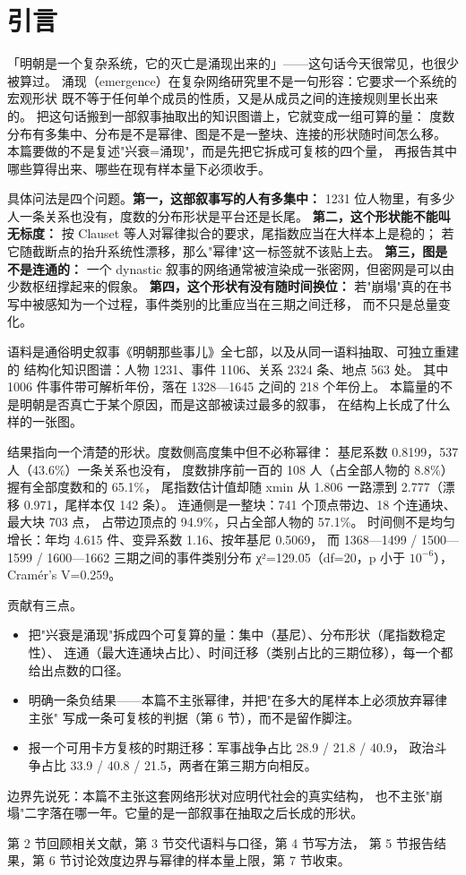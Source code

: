 \section{引言}

「明朝是一个复杂系统，它的灭亡是涌现出来的」——这句话今天很常见，也很少被算过。
涌现（emergence）在复杂网络研究里不是一句形容：它要求一个系统的宏观形状
既不等于任何单个成员的性质，又是从成员之间的连接规则里长出来的。
把这句话搬到一部叙事抽取出的知识图谱上，它就变成一组可算的量：
度数分布有多集中、分布是不是幂律、图是不是一整块、连接的形状随时间怎么移。
本篇要做的不是复述"兴衰=涌现"，而是先把它拆成可复核的四个量，
再报告其中哪些算得出来、哪些在现有样本量下必须收手。

具体问法是四个问题。\textbf{第一，这部叙事写的人有多集中：}
1231 位人物里，有多少人一条关系也没有，度数的分布形状是平台还是长尾。
\textbf{第二，这个形状能不能叫无标度：}
按 Clauset 等人对幂律拟合的要求，尾指数应当在大样本上是稳的；
若它随截断点的抬升系统性漂移，那么"幂律"这一标签就不该贴上去。
\textbf{第三，图是不是连通的：}
一个 dynastic 叙事的网络通常被渲染成一张密网，但密网是可以由少数枢纽撑起来的假象。
\textbf{第四，这个形状有没有随时间换位：}
若"崩塌"真的在书写中被感知为一个过程，事件类别的比重应当在三期之间迁移，
而不只是总量变化。

语料是通俗明史叙事《明朝那些事儿》全七部，以及从同一语料抽取、可独立重建的
结构化知识图谱：人物 1231、事件 1106、关系 2324 条、地点 563 处。
其中 1006 件事件带可解析年份，落在 1328—1645 之间的 218 个年份上。
本篇量的不是明朝是否真亡于某个原因，而是这部被读过最多的叙事，
在结构上长成了什么样的一张图。

结果指向一个清楚的形状。度数侧高度集中但不必称幂律：
基尼系数 0.8199，537 人（43.6\%）一条关系也没有，
度数排序前一百的 108 人（占全部人物的 8.8\%）握有全部度数和的 65.1\%，
尾指数估计值却随 xmin 从 1.806 一路漂到 2.777（漂移 0.971，尾样本仅 142 条）。
连通侧是一整块：741 个顶点带边、18 个连通块、最大块 703 点，
占带边顶点的 94.9\%，只占全部人物的 57.1\%。
时间侧不是均匀增长：年均 4.615 件、变异系数 1.16、按年基尼 0.5069，
而 1368—1499 / 1500—1599 / 1600—1662 三期之间的事件类别分布
χ²=129.05（df=20，p 小于 $10^{-6}$），Cramér's V=0.259。

贡献有三点。
\begin{itemize}
\item 把"兴衰是涌现"拆成四个可复算的量：集中（基尼）、分布形状（尾指数稳定性）、
连通（最大连通块占比）、时间迁移（类别占比的三期位移），每一个都给出点数的口径。
\item 明确一条负结果——本篇不主张幂律，并把"在多大的尾样本上必须放弃幂律主张"
写成一条可复核的判据（第 6 节），而不是留作脚注。
\item 报一个可用卡方复核的时期迁移：军事战争占比 28.9 / 21.8 / 40.9，
政治斗争占比 33.9 / 40.8 / 21.5，两者在第三期方向相反。
\end{itemize}

边界先说死：本篇不主张这套网络形状对应明代社会的真实结构，
也不主张"崩塌"二字落在哪一年。它量的是一部叙事在抽取之后长成的形状。

第 2 节回顾相关文献，第 3 节交代语料与口径，第 4 节写方法，
第 5 节报告结果，第 6 节讨论效度边界与幂律的样本量上限，第 7 节收束。
